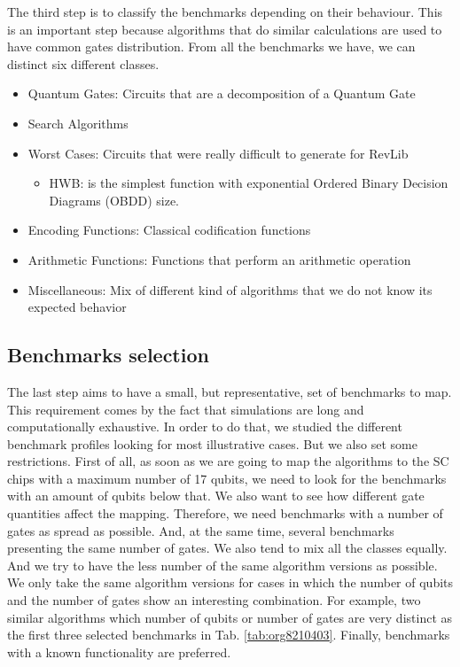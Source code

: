 The third step is to classify the benchmarks depending on their behaviour.
This is an important step because algorithms that do similar calculations are used to have common gates distribution.
From all the benchmarks we have, we can distinct six different classes.

\begin{itemize}
\item Quantum Gates: Circuits that are a decomposition of a Quantum Gate
\item Search Algorithms
\item Worst Cases: Circuits that were really difficult to generate for RevLib
\begin{itemize}
\item HWB: is the simplest function with exponential Ordered Binary Decision Diagrams (OBDD) size.
\end{itemize}
\item Encoding Functions: Classical codification functions
\item Arithmetic Functions: Functions that perform an arithmetic operation
\item Miscellaneous: Mix of different kind of algorithms that we do not know its expected behavior
\end{itemize}


\subsection*{Benchmarks selection}
\label{sec:orgb1ccb3c}

The last step aims to have a small, but representative, set of benchmarks to map.
This requirement comes by the fact that simulations are long and computationally exhaustive.
In order to do that, we studied the different benchmark profiles looking for most illustrative cases.
But we also set some restrictions.
First of all, as soon as we are going to map the algorithms to the SC chips with a maximum number of 17 qubits, we need to look for the benchmarks with an amount of qubits below that.
We also want to see how different gate quantities affect the mapping.
Therefore, we need benchmarks with a number of gates as spread as possible.
And, at the same time, several benchmarks presenting the same number of gates.
We also tend to mix all the classes equally.
And we try to have the less number of the same algorithm versions as possible.
We only take the same algorithm versions for cases in which the number of qubits and the number of gates show an interesting combination.
For example, two similar algorithms which number of qubits or number of gates are very distinct as the first three selected benchmarks in Tab. \ref{tab:org8210403}.
Finally, benchmarks with a known functionality are preferred.

